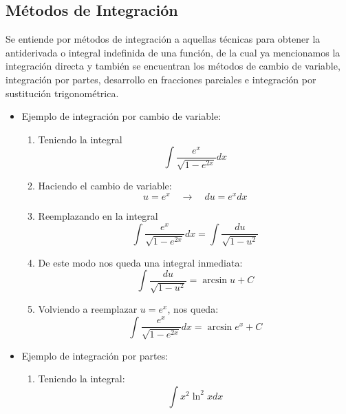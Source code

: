 \documentclass[../main]{subfiles}
\begin{document}
\subsection*{Métodos de Integración}
Se entiende por métodos de integración a aquellas técnicas para obtener la antiderivada o integral indefinida de una función, de la cual ya mencionamos la integración directa y también se encuentran los métodos de cambio de variable, integración por partes, desarrollo en fracciones parciales e integración por sustitución trigonométrica.
\begin{itemize}
    \item Ejemplo de integración por cambio de variable:
    \begin{enumerate}
        \item Teniendo la integral
            \begin{equation*}
                \int \dfrac{e^x}{\sqrt{1-e^{2x}}}dx
            \end{equation*}
        \item Haciendo el cambio de variable:
            \begin{equation*}
                u=e^x \quad \rightarrow \quad du=e^xdx
            \end{equation*}
        \item Reemplazando en la integral
            \begin{equation*}
                \int \dfrac{e^x}{\sqrt{1-e^{2x}}}dx=\int \dfrac{du}{\sqrt{1-u^2}}
            \end{equation*}
        \item De este modo nos queda una integral inmediata:
            \begin{equation*}
                \int \dfrac{du}{\sqrt{1-u^2}}=\arcsin{u}+C
            \end{equation*}
        \item Volviendo a reemplazar $u=e^x$, nos queda:
            \begin{equation*}
                \int \dfrac{e^x}{\sqrt{1-e^{2x}}}dx=\arcsin{e^x}+C
            \end{equation*}
    \end{enumerate}
    \item Ejemplo de integración por partes:
    \begin{enumerate}
        \item Teniendo la integral:
            \begin{equation*}
                \int x^2 \ln^2{x}dx
            \end{equation*}

\end{enumerate}
\end{itemize}
\end{document}
